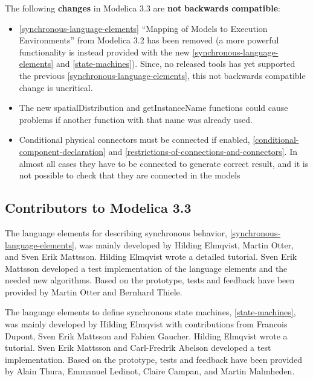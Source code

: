 \documentclass[10pt,a4paper]{report}
\def\doublelabel#1{\label{#1}}
\begin{document}
The following \textbf{changes} in Modelica 3.3 are \textbf{not}
\textbf{backwards compatible}:

\begin{itemize}
\item
  \ref{synchronous-language-elements} ``Mapping of Models to Execution Environments'' from
  Modelica 3.2 has been removed (a more powerful functionality is
  instead provided with the new \ref{synchronous-language-elements} and \ref{state-machines}). Since, no
  released tools has yet supported the previous \ref{synchronous-language-elements}, this not
  backwards compatible change is uncritical.
\item
  The new spatialDistribution and getInstanceName functions could cause
  problems if another function with that name was already used.
\end{itemize}

\begin{itemize}
\item
  Conditional physical connectors must be connected if enabled, 
  \ref{conditional-component-declaration} 
  and \ref{restrictions-of-connections-and-connectors}. In almost all cases they have to be connected
  to generate correct result, and it is not possible to check that they
  are connected in the models
\end{itemize}

\subsection{Contributors to Modelica 3.3}\doublelabel{contributors-to-modelica-3-3}

The language elements for describing synchronous behavior, \ref{synchronous-language-elements},
was mainly developed by Hilding Elmqvist, Martin Otter, and Sven Erik
Mattsson. Hilding Elmqvist wrote a detailed tutorial. Sven Erik Mattsson
developed a test implementation of the language elements and the needed
new algorithms. Based on the prototype, tests and feedback have been
provided by Martin Otter and Bernhard Thiele.

The language elements to define synchronous state machines, \ref{state-machines},
was mainly developed by Hilding Elmqvist with contributions from
Francois Dupont, Sven Erik Mattsson and Fabien Gaucher. Hilding Elmqvist
wrote a tutorial. Sven Erik Mattsson and Carl-Fredrik Abelson developed
a test implementation. Based on the prototype, tests and feedback have
been provided by Alain Thura, Emmanuel Ledinot, Claire Campan, and
Martin Malmheden.
\end{document}
